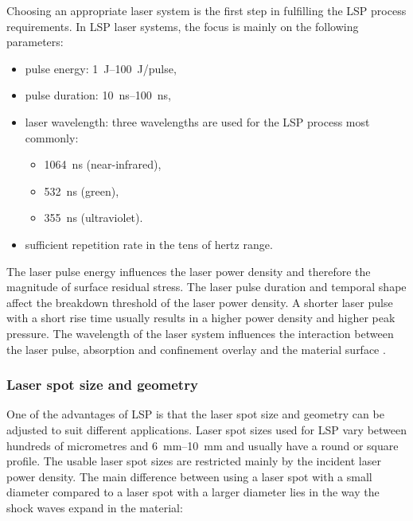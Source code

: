 Choosing an appropriate laser system is the first step in fulfilling the LSP process requirements. In LSP laser systems, the focus is mainly on the following parameters:
\begin{itemize}

    \item pulse energy: \SIrange{1}{100}{\joule}/pulse,
    \item pulse duration: \SIrange{10}{100}{\nano\second},
    
    \item laser wavelength: three wavelengths are used for the LSP process most commonly:
    
    \begin{itemize}

        \item \SI{1064}{\nano\second} (near-infrared),
        \item \SI{532}{\nano\second} (green),
        \item \SI{355}{\nano\second} (ultraviolet).

    \end{itemize}
    
    \item sufficient repetition rate in the tens of hertz range.

\end{itemize}

The laser pulse energy influences the laser power density and therefore the magnitude of surface residual stress. 
The laser pulse duration and temporal shape affect the breakdown threshold of the laser power density. A shorter laser pulse with a short rise time usually results in a higher power density and higher peak pressure. 
The wavelength of the laser system influences the interaction between the laser pulse, absorption and confinement overlay and the material surface \cite{fabbro_peyre_berthe_scherpereel_1998}. 

\subsubsection*{Laser spot size and geometry}

One of the advantages of LSP is that the laser spot size and geometry can be adjusted to suit different applications. Laser spot sizes used for LSP vary between hundreds of micrometres and \SIrange{6}{10}{\mm} and usually have a round or square profile. The usable laser spot sizes are restricted mainly by the incident laser power density. The main difference between using a laser spot with a small diameter compared to a laser spot with a larger diameter lies in the way the shock waves expand in the material:

